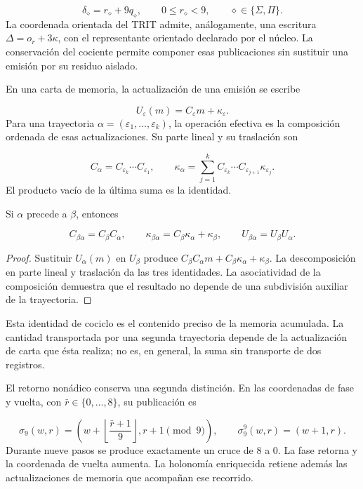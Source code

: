 \[
\delta_\diamond=r_\diamond+9q_\diamond,
\qquad 0\leq r_\diamond<9,
\qquad \diamond\in\{\Sigma,\Pi\}.
\]
La coordenada orientada del TRIT admite, análogamente, una escritura \(\Delta=o_r+3\kappa\), con el representante orientado declarado por el núcleo. La conservación del cociente permite componer esas publicaciones sin sustituir una emisión por su residuo aislado.

En una carta de memoria, la actualización de una emisión se escribe

\[
U_\varepsilon(m)=C_\varepsilon m+\kappa_\varepsilon.
\]
Para una trayectoria \(\alpha=(\varepsilon_1,\ldots,\varepsilon_k)\), la operación efectiva es la composición ordenada de esas actualizaciones. Su parte lineal y su traslación son

\[
C_\alpha=C_{\varepsilon_k}\cdots C_{\varepsilon_1},
\qquad
\kappa_\alpha=
\sum_{j=1}^{k}C_{\varepsilon_k}\cdots
C_{\varepsilon_{j+1}}\kappa_{\varepsilon_j}.
\]
El producto vacío de la última suma es la identidad.

\begin{proposition}
\label{prop:continuo-compatibilidad-afin}
Si \(\alpha\) precede a \(\beta\), entonces

\[
C_{\beta\alpha}=C_\beta C_\alpha,
\qquad
\kappa_{\beta\alpha}=C_\beta\kappa_\alpha+\kappa_\beta,
\qquad
U_{\beta\alpha}=U_\beta U_\alpha.
\]
\end{proposition}
\begin{proof}
Sustituir \(U_\alpha(m)\) en \(U_\beta\) produce \(C_\beta C_\alpha m+C_\beta\kappa_\alpha+\kappa_\beta\). La descomposición en parte lineal y traslación da las tres identidades. La asociatividad de la composición demuestra que el resultado no depende de una subdivisión auxiliar de la trayectoria.
\end{proof}

Esta identidad de cociclo es el contenido preciso de la memoria acumulada. La cantidad transportada por una segunda trayectoria depende de la actualización de carta que ésta realiza; no es, en general, la suma sin transporte de dos registros.

El retorno nonádico conserva una segunda distinción. En las coordenadas de fase y vuelta, con \(\bar r\in\{0,\ldots,8\}\), su publicación es

\[
\sigma_9(w,r)=
\left(w+\left\lfloor\frac{\bar r+1}{9}\right\rfloor,
r+1\pmod9\right),
\qquad
\sigma_9^9(w,r)=(w+1,r).
\]
Durante nueve pasos se produce exactamente un cruce de \(8\) a \(0\). La fase retorna y la coordenada de vuelta aumenta. La holonomía enriquecida retiene además las actualizaciones de memoria que acompañan ese recorrido.

